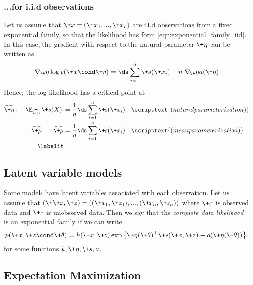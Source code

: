 \documentclass{article} %
\newcommand{\obs}{\+x}
\newcommand{\obsCaps}{X}
\newcommand{\logNormalizerFunction}{a}
\newcommand{\sufficientStatsFunction}{\+s}
\newcommand{\carrierDensity}{h}
\newcommand{\meanParam}{\+\mu}
\newcommand{\param}{\+\theta}
\newcommand{\naturalParam}{\+\eta}
\begin{document}
\subsubsection{...for i.i.d observations}

Let us assume that $\+x=(\obs_1, ..., \obs_n)$ are i.i.d observations  from a fixed exponential family, so that the likelihood has form \eqref{eqn:exponential_family_iid}. In this case, the gradient with respect to the natural parameter $\naturalParam$ can be written as
%
\[ \nabla_\naturalParam \log p(\obs \cond \naturalParam) = \ds\sum_{i=1}^n \sufficientStatsFunction(\obs_i) - n \; \nabla_\naturalParam \logNormalizerFunction(\naturalParam) \]
%
Hence, the log likelihood has a critical point at  
%
\begin{align*}
\widehat{\naturalParam} : \quad   \E_{\widehat{\naturalParam}}[\sufficientStatsFunction(\obsCaps)] &= \frac{1}{n} \ds\sum_{i=1}^n \sufficientStatsFunction(\obs_i) && \scripttext{(natural parameterization)} \\
\widehat{\meanParam} : \quad \widehat{\meanParam}&= \frac{1}{n} \ds\sum_{i=1}^n \sufficientStatsFunction(\obs_i) && \scripttext{(mean parameterization)} \\
\labelit \label{eqn:condition_for_critical_point_of_EF_likelihood_under_iid_observations}
\end{align*}
% 
\subsection{Latent variable models}

Some models have latent variables associated with each observation.   Let us  assume that $(\+\obs, \+z)=((\obs_1,\+z_1), ..., (\obs_n, \+z_n))$ where $\+x$ is observed data and $\+z$ is unobserved data.   Then we say that the \textit{complete data likelihood} is an exponential family if we can write
%
\begin{align}
 p(\+x, \+z \cond \param) = \carrierDensity(\+x, \+z) \exp \big\{ \naturalParam(\param)^\top \sufficientStatsFunction(\+x, \+z) - \logNormalizerFunction(\naturalParam(\param))\big\}. 
\label{eqn:exponential_family_complete_data_likelihood}
 \end{align}
%
for some functions $\carrierDensity, \naturalParam, \sufficientStatsFunction, \logNormalizerFunction$. 

\subsection{Expectation Maximization}
\end{document}
